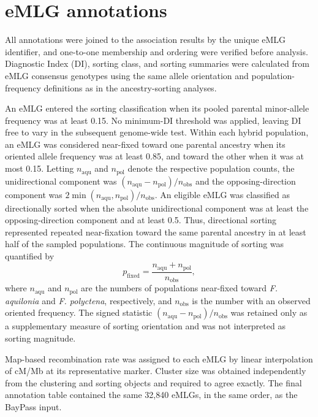 \documentclass[11pt,a4paper]{article}
\begin{document}
\section{eMLG annotations}

All annotations were joined to the association results by the unique eMLG identifier, and one-to-one membership and ordering were verified before analysis. Diagnostic Index (DI), sorting class, and sorting summaries were calculated from eMLG consensus genotypes using the same allele orientation and population-frequency definitions as in the ancestry-sorting analyses.

An eMLG entered the sorting classification when its pooled parental minor-allele frequency was at least 0.15. No minimum-DI threshold was applied, leaving DI free to vary in the subsequent genome-wide test. Within each hybrid population, an eMLG was considered near-fixed toward one parental ancestry when its oriented allele frequency was at least 0.85, and toward the other when it was at most 0.15. Letting $n_{\mathrm{aqu}}$ and $n_{\mathrm{pol}}$ denote the respective population counts, the unidirectional component was $(n_{\mathrm{aqu}}-n_{\mathrm{pol}})/n_{\mathrm{obs}}$ and the opposing-direction component was $2\min(n_{\mathrm{aqu}},n_{\mathrm{pol}})/n_{\mathrm{obs}}$. An eligible eMLG was classified as directionally sorted when the absolute unidirectional component was at least the opposing-direction component and at least 0.5. Thus, directional sorting represented repeated near-fixation toward the same parental ancestry in at least half of the sampled populations. The continuous magnitude of sorting was quantified by
\begin{equation}
  p_{\mathrm{fixed}} =
  \frac{n_{\mathrm{aqu}}+n_{\mathrm{pol}}}{n_{\mathrm{obs}}},
\end{equation}
where $n_{\mathrm{aqu}}$ and $n_{\mathrm{pol}}$ are the numbers of populations near-fixed toward \textit{F. aquilonia} and \textit{F. polyctena}, respectively, and $n_{\mathrm{obs}}$ is the number with an observed oriented frequency. The signed statistic $(n_{\mathrm{aqu}}-n_{\mathrm{pol}})/n_{\mathrm{obs}}$ was retained only as a supplementary measure of sorting orientation and was not interpreted as sorting magnitude.

Map-based recombination rate was assigned to each eMLG by linear interpolation of cM/Mb at its representative marker. Cluster size was obtained independently from the clustering and sorting objects and required to agree exactly. The final annotation table contained the same 32,840 eMLGs, in the same order, as the BayPass input.
\end{document}
